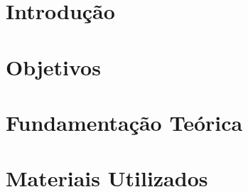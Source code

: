 \documentclass[12pt,openright,oneside,a4paper,brazil]{abntex2}
\begin{document}
\frenchspacing


\imprimircapa

\imprimirfolhaderosto*

\tableofcontents*
\cleardoublepage



\textual



\chapter{Introdução}
\label{cap:intro}

\lipsum[4-5]\cite{stevenson}
\lipsum[3-4]
\lipsum[2-3]
\lipsum[3-4]





\chapter{Objetivos}
\label{cap:objetivos}

\lipsum[1-2]



\chapter{Fundamentação Teórica}
\label{cap:fundamentacao}

\lipsum[3-4]\cite{canossa2007programa}
\lipsum[3-4]\cite{pizzali2003calculo}
\lipsum[3-4]\cite{stevenson}




\chapter{Materiais Utilizados}
\label{cap:materias}
\end{document}

